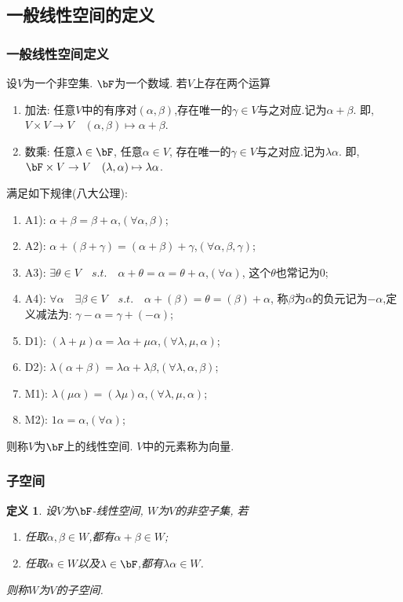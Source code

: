 \documentclass{article}
\newtheorem{definition}[theorem]{定义}
\renewcommand{\blue }[1]{{\textcolor[rgb]{0,0,1}{#1}}}
\begin{document}
\subsection{一般线性空间的定义}

\subsubsection{一般线性空间定义}
设$V$为一个非空集. $\bF$为一个数域. 若$V$上存在两个运算
\begin{enumerate}
\item \blue{加法}: 任意$V$中的有序对$(\alpha,\beta)$,存在唯一的$\gamma\in V$与之对应.记为$\alpha+\beta$. 即, $V\times V \rightarrow V \quad (\alpha,\beta)\mapsto \alpha+\beta$.
\item \blue{数乘}: 任意$\lambda\in \bF$, 任意$\alpha\in V$, 存在唯一的$\gamma\in V$与之对应.记为$\lambda\alpha$. 即, $\bF\times V\rightarrow V \quad (\lambda,\alpha)\mapsto \lambda \alpha$.
\end{enumerate}
满足如下规律(\blue{八大公理}):
\begin{enumerate}
\item A1): $\alpha+\beta=\beta+\alpha$,\quad $(\forall\alpha,\beta)$;
\item A2): $\alpha+(\beta+\gamma)=(\alpha+\beta)+\gamma$,\quad $(\forall\alpha,\beta,\gamma)$;
\item A3): $\exists\theta\in V\quad s.t. \quad \alpha+\theta=\alpha=\theta+\alpha$,\quad $(\forall\alpha)$, 这个$\theta$也常记为$0$;
\item A4): $\forall \alpha \quad \exists \beta\in V \quad s.t. \quad \alpha+(\beta)=\theta=(\beta)+\alpha$, 称$\beta$为$\alpha$的负元记为$-\alpha$,定义减法为: $\gamma-\alpha=\gamma+(-\alpha)$;
\item D1): $(\lambda+\mu)\alpha=\lambda \alpha + \mu \alpha$,\quad $(\forall \lambda,\mu,\alpha)$;
\item D2): $\lambda (\alpha+\beta) =\lambda \alpha + \lambda \beta$,\quad $(\forall\lambda,\alpha,\beta)$;
\item M1): $\lambda(\mu \alpha)=(\lambda \mu)\alpha$,\quad $(\forall\lambda,\mu,\alpha)$;
\item M2): $1\alpha = \alpha$,\quad $(\forall\alpha)$;
\end{enumerate}
则称$V$为$\bF$上的\blue{线性空间}.  $V$中的元素称为\blue{向量}.


\subsubsection{子空间}
\begin{definition}
设$V$为$\bF$-线性空间, $W$为$V$的非空子集, 若
\begin{enumerate}
\item 任取$\alpha,\beta\in W$,都有$\alpha+\beta\in W$;
\item 任取$\alpha\in W$以及$\lambda\in \bF$,都有$\lambda\alpha\in W$.
\end{enumerate}
则称$W$为$V$的\blue{子空间}.
\end{definition}
\end{document}
